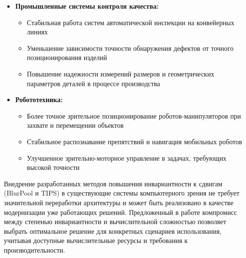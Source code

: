 \begin{itemize}
    \item \textbf{Промышленные системы контроля качества:}
    \begin{itemize}
        \item Стабильная работа систем автоматической инспекции на конвейерных линиях
        \item Уменьшение зависимости точности обнаружения дефектов от точного позиционирования изделий
        \item Повышение надежности измерений размеров и геометрических параметров деталей в процессе производства
    \end{itemize}
    
    \item \textbf{Робототехника:}
    \begin{itemize}
        \item Более точное зрительное позиционирование роботов-манипуляторов при захвате и перемещении объектов
        \item Стабильное распознавание препятствий и навигация мобильных роботов
        \item Улучшенное зрительно-моторное управление в задачах, требующих высокой точности
    \end{itemize}
\end{itemize}

Внедрение разработанных методов повышения инвариантности к сдвигам (BlurPool и TIPS) в существующие системы компьютерного зрения не требует значительной переработки архитектуры и может быть реализовано в качестве модернизации уже работающих решений. Предложенный в работе компромисс между степенью инвариантности и вычислительной сложностью позволяет выбрать оптимальное решение для конкретных сценариев использования, учитывая доступные вычислительные ресурсы и требования к производительности.

\newpage
